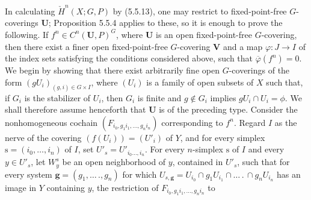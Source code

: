 In calculating $\check H^n(X;G,P)$ by (5.5.13), one may restrict to
fixed-point-free $G$-coverings ${\mathbf U}$; Proposition 5.5.4 applies to
these, so it is enough to prove the following. If
$f^n\in C^n({\mathbf U},P)^G$, where ${\mathbf U}$ is an open fixed-point-free
$G$-covering, then there exist a finer open fixed-point-free $G$-covering
${\mathbf V}$ and a map $\varphi:J\to I$ of the index sets satisfying the
conditions considered above, such that $\overline\varphi(f^n)=0$. We begin by
showing that there exist arbitrarily fine open $G$-coverings of the form
$(gU_i)_{(g,i)\in G\times I}$, where $(U_i)$ is a family of open subsets of
$X$ such that, if $G_i$ is the stabilizer of $U_i$, then $G_i$ is finite and
$g\notin G_i$ implies $gU_i\cap U_i=\phi$. We shall therefore assume
henceforth that ${\mathbf U}$ is of the preceding type.
Consider the nonhomogeneous cochain
$(F_{i_0,g_1i_1,\ldots,g_ni_n})$ corresponding to $f^n$. Regard $I$ as the
nerve of the covering $(f(U_i))=(U'_i)$ of $Y$, and for every simplex
$\mathrm s=(i_0,\ldots,i_n)$ of $I$, set $U'_s=U'_{i_0\ldots,i_n}$. For every
$n$-simplex $\mathrm s$ of $I$ and every $y\in U'_s$, let $W^s_y$ be an open
neighborhood of $y$, contained in $U'_s$, such that for every system
$\mathbf g=(g_1,\ldots\,.,g_n)$ for which
$U_{s,\mathbf g}=U_{i_0}\cap g_1U_{i_1}\cap\ldots\,.\,\cap g_nU_{i_n}$ has an
image in $Y$ containing $y$, the restriction of
$F_{i_0,g_1i_1,\ldots,g_ni_n}$ to

